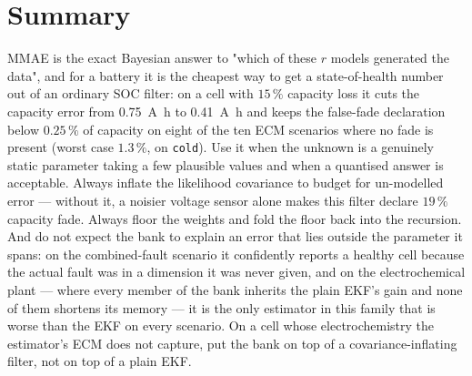 \section{Summary}
MMAE is the exact Bayesian answer to "which of these $r$ models generated the data", and for a
battery it is the cheapest way to get a state-of-health number out of an ordinary SOC filter: on a
cell with $15\,\%$ capacity loss it cuts the capacity error from \SI{+0.75}{\ampere\hour} to
\SI{+0.41}{\ampere\hour} and keeps the false-fade declaration below $0.25\,\%$ of capacity on eight
of the ten ECM scenarios where no fade is present (worst case $1.3\,\%$, on \texttt{cold}).  Use it when the unknown is a genuinely static parameter taking
a few plausible values and when a quantised answer is acceptable.  Always inflate the likelihood
covariance to budget for un-modelled error --- without it, a noisier voltage sensor alone makes this
filter declare $19\,\%$ capacity fade.  Always floor the weights and fold the floor back into the
recursion.  And do not expect the bank to explain an error that lies outside the parameter it
spans: on the combined-fault scenario it confidently reports a healthy cell because the actual fault
was in a dimension it was never given, and on the electrochemical plant --- where every member of the
bank inherits the plain EKF's gain and none of them shortens its memory --- it is the only estimator
in this family that is worse than the EKF on every scenario.  On a cell whose electrochemistry the
estimator's ECM does not capture, put the bank on top of a covariance-inflating filter, not on top of
a plain EKF.
